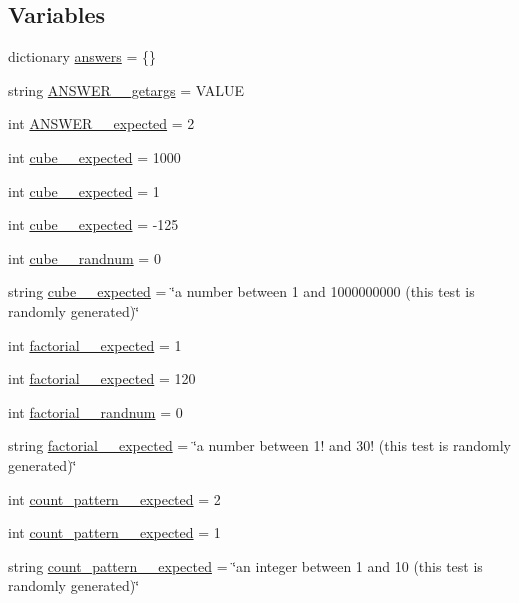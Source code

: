 \subsection*{Variables}
\begin{DoxyCompactItemize}
\item 
dictionary \hyperlink{namespacetests_ae42eabc36e6ab074bbcf241bcfe07c3f}{answers} = \{\}
\item 
string \hyperlink{namespacetests_a65680861a9d364da0a53575e7f91cb2e}{A\+N\+S\+W\+E\+R\+\_\+\_\+getargs} = \textquotesingle{}V\+A\+L\+U\+E\textquotesingle{}
\item 
int \hyperlink{namespacetests_a66a03482e4412871b8bbd4f0c29fcc1c}{A\+N\+S\+W\+E\+R\+\_\+\_\+expected} = 2
\item 
int \hyperlink{namespacetests_aa1d0d3104146bdad07555bf7544787f5}{cube\+\_\+\_\+expected} = 1000
\item 
int \hyperlink{namespacetests_a73b0c5584c555814213c44e21368d58d}{cube\+\_\+\_\+expected} = 1
\item 
int \hyperlink{namespacetests_af7ab12c493c42f39d1d3be2e4f2997c8}{cube\+\_\+\_\+expected} = -\/125
\item 
int \hyperlink{namespacetests_a025a27d3126aff00f2e8351cc47b98af}{cube\+\_\+\_\+randnum} = 0
\item 
string \hyperlink{namespacetests_ae3685c78796cb7b24747ab8cb9ee8f7c}{cube\+\_\+\_\+expected} = \char`\"{}a number between 1 and 1000000000 (this test is randomly generated)\char`\"{}
\item 
int \hyperlink{namespacetests_a559d14a381b4ccb68d5015f9255a35d5}{factorial\+\_\+\_\+expected} = 1
\item 
int \hyperlink{namespacetests_ad75ade2f76275339e399cef79961ef0a}{factorial\+\_\+\_\+expected} = 120
\item 
int \hyperlink{namespacetests_a3d9a186d2218e756c775fe6936e7ca4c}{factorial\+\_\+\_\+randnum} = 0
\item 
string \hyperlink{namespacetests_aaf40b373592b31f28f148fcee71328aa}{factorial\+\_\+\_\+expected} = \char`\"{}a number between 1! and 30! (this test is randomly generated)\char`\"{}
\item 
int \hyperlink{namespacetests_afc88b6d68d8f1c91c38ec64907595556}{count\+\_\+pattern\+\_\+\_\+expected} = 2
\item 
int \hyperlink{namespacetests_a87876ab53ac9958552e8a64eae004894}{count\+\_\+pattern\+\_\+\_\+expected} = 1
\item 
string \hyperlink{namespacetests_a3baa98be8cec0e98640798f4d798b563}{count\+\_\+pattern\+\_\+\_\+expected} = \char`\"{}an integer between 1 and 10 (this test is randomly generated)\char`\"{}

\end{DoxyCompactItemize}
